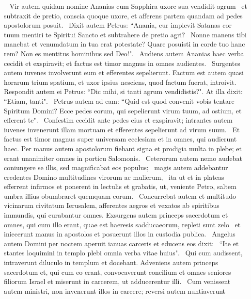 \begin{biblechapter}   
\verse Vir autem quidam nomine Ananias cum Sapphira uxore sua vendidit agrum  
\verse et subtraxit de pretio, conscia quoque uxore, et afferens partem quandam ad pedes apostolorum posuit.  
\verse Dixit autem Petrus: “Anania, cur implevit Satanas cor tuum mentiri te Spiritui Sancto et subtrahere de pretio agri?  
\verse Nonne manens tibi manebat et venumdatum in tua erat potestate? Quare posuisti in corde tuo hanc rem? Non es mentitus hominibus sed Deo!".  
\verse Audiens autem Ananias haec verba cecidit et exspiravit; et factus est timor magnus in omnes audientes.  
\verse Surgentes autem iuvenes involverunt eum et efferentes sepelierunt. 
\verse Factum est autem quasi horarum trium spatium, et uxor ipsius nesciens, quod factum fuerat, introivit.  
\verse Respondit autem ei Petrus: “Dic mihi, si tanti agrum vendidistis?". At illa dixit: “Etiam, tanti".  
\verse Petrus autem ad eam: “Quid est quod convenit vobis tentare Spiritum Domini? Ecce pedes eorum, qui sepelierunt virum tuum, ad ostium, et efferent te".  
\verse Confestim cecidit ante pedes eius et exspiravit; intrantes autem iuvenes invenerunt illam mortuam et efferentes sepelierunt ad virum suum.  
\verse Et factus est timor magnus super universam ecclesiam et in omnes, qui audierunt haec. 
\verse Per manus autem apostolorum fiebant signa et prodigia multa in plebe; et erant unanimiter omnes in porticu Salomonis.  
\verse Ceterorum autem nemo audebat coniungere se illis, sed magnificabat eos populus;  
\verse magis autem addebantur credentes Domino multitudines virorum ac mulierum,  
\verse ita ut et in plateas efferrent infirmos et ponerent in lectulis et grabatis, ut, veniente Petro, saltem umbra illius obumbraret quemquam eorum.  
\verse Concurrebat autem et multitudo vicinarum civitatum Ierusalem, afferentes aegros et vexatos ab spiritibus immundis, qui curabantur omnes. 
\verse Exsurgens autem princeps sacerdotum et omnes, qui cum illo erant, quae est haeresis sadducaeorum, repleti sunt zelo  
\verse et iniecerunt manus in apostolos et posuerunt illos in custodia publica.  
\verse Angelus autem Domini per noctem aperuit ianuas carceris et educens eos dixit:  
\verse “Ite et stantes loquimini in templo plebi omnia verba vitae huius".  
\verse Qui cum audissent, intraverunt diluculo in templum et docebant. Adveniens autem princeps sacerdotum et, qui cum eo erant, convocaverunt concilium et omnes seniores filiorum Israel et miserunt in carcerem, ut adducerentur illi.  
\verse Cum venissent autem ministri, non invenerunt illos in carcere; reversi autem nuntiaverunt  

\end{biblechapter}
